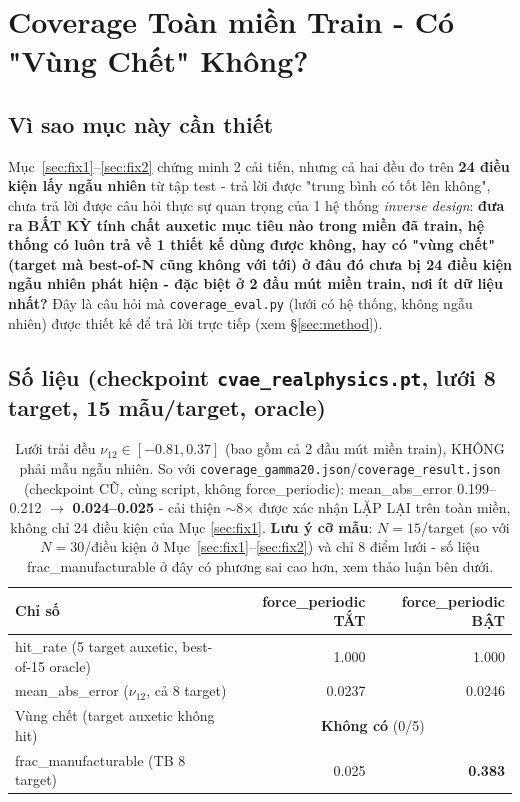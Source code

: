 \documentclass[11pt,a4paper]{article}
\begin{document}
\section{Coverage Toàn miền Train - Có "Vùng Chết" Không?}
\label{sec:coverage}

\subsection{Vì sao mục này cần thiết}
Mục~\ref{sec:fix1}--\ref{sec:fix2} chứng minh 2 cải tiến, nhưng cả hai đều đo trên \textbf{24
điều kiện lấy ngẫu nhiên} từ tập test - trả lời được "trung bình có tốt lên không", chưa trả lời
được câu hỏi thực sự quan trọng của 1 hệ thống \emph{inverse design}: \textbf{đưa ra BẤT KỲ tính
chất auxetic mục tiêu nào trong miền đã train, hệ thống có luôn trả về 1 thiết kế dùng được
không, hay có "vùng chết" (target mà best-of-N cũng không với tới) ở đâu đó chưa bị 24 điều kiện
ngẫu nhiên phát hiện - đặc biệt ở 2 đầu mút miền train, nơi ít dữ liệu nhất?} Đây là câu hỏi mà
\texttt{coverage\_eval.py} (lưới có hệ thống, không ngẫu nhiên) được thiết kế để trả lời trực
tiếp (xem \S\ref{sec:method}).

\subsection{Số liệu (checkpoint \texttt{cvae\_realphysics.pt}, lưới 8 target, 15 mẫu/target, oracle)}

\begin{table}[H]
\centering
\begin{tabular}{@{}lrr@{}}
\toprule
\textbf{Chỉ số} & \textbf{force\_periodic TẮT} & \textbf{force\_periodic BẬT} \\
\midrule
hit\_rate (5 target auxetic, best-of-15 oracle) & 1.000 & 1.000 \\
mean\_abs\_error ($\nu_{12}$, cả 8 target) & 0.0237 & \cellcolor{serOrange!15}0.0246 \\
Vùng chết (target auxetic không hit) & \multicolumn{2}{c}{\textbf{Không có} (0/5)} \\
frac\_manufacturable (TB 8 target) & 0.025 & \cellcolor{serOrange!15}\textbf{0.383} \\
\bottomrule
\end{tabular}
\caption{Lưới trải đều $\nu_{12}\in[-0.81,0.37]$ (bao gồm cả 2 đầu mút miền train), KHÔNG phải
mẫu ngẫu nhiên. So với \texttt{coverage\_gamma20.json}/\texttt{coverage\_result.json} (checkpoint
CŨ, cùng script, không force\_periodic): mean\_abs\_error 0.199--0.212 $\to$ \textbf{0.024--0.025}
- cải thiện $\sim$8$\times$ được xác nhận LẶP LẠI trên toàn miền, không chỉ 24 điều kiện của Mục
\ref{sec:fix1}. \textbf{Lưu ý cỡ mẫu}: $N=15$/target (so với $N=30$/điều kiện ở
Mục~\ref{sec:fix1}--\ref{sec:fix2}) và chỉ 8 điểm lưới - số liệu frac\_manufacturable ở đây có
phương sai cao hơn, xem thảo luận bên dưới.}
\label{tab:coverage}
\end{table}
\end{document}
